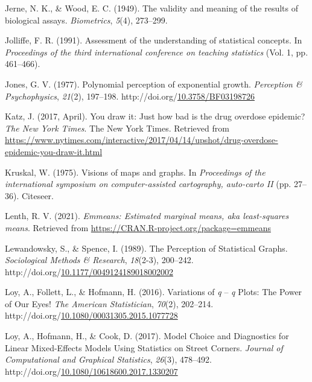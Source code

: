 \documentclass[print]{nuthesis}
\newlength{\cslhangindent}
\newenvironment{CSLReferences}%
{\setlength{\parindent}{0pt}%
\everypar{\setlength{\hangindent}{\cslhangindent}}\ignorespaces}%
{\par}
\begin{document}
\begin{CSLReferences}{1}{0}
\leavevmode{}%
Jerne, N. K., \& Wood, E. C. (1949). The validity and meaning of the results of biological assays. \emph{Biometrics}, \emph{5}(4), 273--299.

\leavevmode{}%
Jolliffe, F. R. (1991). Assessment of the understanding of statistical concepts. In \emph{Proceedings of the third international conference on teaching statistics} (Vol. 1, pp. 461--466).

\leavevmode{}%
Jones, G. V. (1977). Polynomial perception of exponential growth. \emph{Perception \& Psychophysics}, \emph{21}(2), 197--198. http://doi.org/\href{https://doi.org/10.3758/BF03198726}{10.3758/BF03198726}

\leavevmode{}%
Katz, J. (2017, April). You draw it: Just how bad is the drug overdose epidemic? \emph{The New York Times}. The New York Times. Retrieved from \url{https://www.nytimes.com/interactive/2017/04/14/upshot/drug-overdose-epidemic-you-draw-it.html}

\leavevmode{}%
Kruskal, W. (1975). Visions of maps and graphs. In \emph{Proceedings of the international symposium on computer-assisted cartography, auto-carto II} (pp. 27--36). Citeseer.

\leavevmode{}%
Lenth, R. V. (2021). \emph{Emmeans: Estimated marginal means, aka least-squares means}. Retrieved from \url{https://CRAN.R-project.org/package=emmeans}

\leavevmode{}%
Lewandowsky, S., \& Spence, I. (1989). The {Perception} of {Statistical} {Graphs}. \emph{Sociological Methods \& Research}, \emph{18}(2-3), 200--242. http://doi.org/\href{https://doi.org/10.1177/0049124189018002002}{10.1177/0049124189018002002}

\leavevmode{}%
Loy, A., Follett, L., \& Hofmann, H. (2016). Variations of \emph{q} -- \emph{q} {Plots}: {The} {Power} of {Our} {Eyes}! \emph{The American Statistician}, \emph{70}(2), 202--214. http://doi.org/\href{https://doi.org/10.1080/00031305.2015.1077728}{10.1080/00031305.2015.1077728}

\leavevmode{}%
Loy, A., Hofmann, H., \& Cook, D. (2017). Model {Choice} and {Diagnostics} for {Linear} {Mixed}-{Effects} {Models} {Using} {Statistics} on {Street} {Corners}. \emph{Journal of Computational and Graphical Statistics}, \emph{26}(3), 478--492. http://doi.org/\href{https://doi.org/10.1080/10618600.2017.1330207}{10.1080/10618600.2017.1330207}


\end{CSLReferences}
\end{document}
